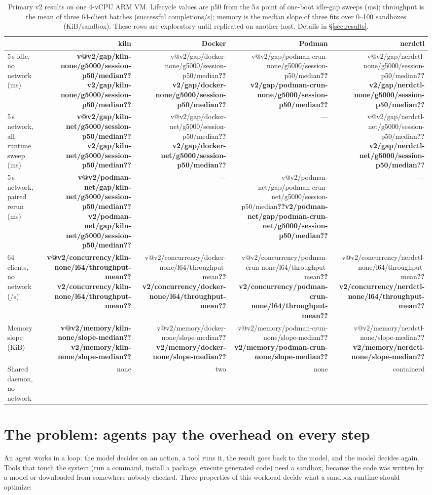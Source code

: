 \documentclass[10pt,letterpaper]{article}
\makeatletter
\newcommand{\Vone}[1]{\ifcsname v@#1\endcsname\pgfmathprintnumber[fixed,precision=1]{\csname v@#1\endcsname}\else\textbf{??#1??}\fi}
\makeatother
\begin{document}
\begin{table}[H]
\centering\footnotesize
\caption{Primary v2 results on one 4-vCPU ARM VM. Lifecycle values are p50 from
the 5\,s point of one-boot idle-gap sweeps (ms); throughput is the mean of
three 64-client batches (successful completions/s); memory is the median slope
of three fits over 0--100 sandboxes (KiB/sandbox). These rows are exploratory
until replicated on another host. Details in \S\ref{sec:results}.}
\label{tab:summary}
\begin{tabularx}{\linewidth}{@{}Xrrrr@{}}
\toprule
 & kiln & Docker & Podman & nerdctl \\
\midrule
5\,s idle, no network (ms) & \textbf{\Vone{v2/gap/kiln-none/g5000/session-p50/median}} & \Vone{v2/gap/docker-none/g5000/session-p50/median} & \Vone{v2/gap/podman-crun-none/g5000/session-p50/median} & \Vone{v2/gap/nerdctl-none/g5000/session-p50/median} \\
5\,s network, all-runtime sweep (ms) & \textbf{\Vone{v2/gap/kiln-net/g5000/session-p50/median}} & \Vone{v2/gap/docker-net/g5000/session-p50/median} & --- & \Vone{v2/gap/nerdctl-net/g5000/session-p50/median} \\
5\,s network, paired rerun (ms) & \textbf{\Vone{v2/podman-net/gap/kiln-net/g5000/session-p50/median}} & --- & \Vone{v2/podman-net/gap/podman-crun-net/g5000/session-p50/median} & --- \\
64 clients, no network (/s) & \textbf{\Vone{v2/concurrency/kiln-none/l64/throughput-mean}} & \Vone{v2/concurrency/docker-none/l64/throughput-mean} & \Vone{v2/concurrency/podman-crun-none/l64/throughput-mean} & \Vone{v2/concurrency/nerdctl-none/l64/throughput-mean} \\
Memory slope (KiB) & \textbf{\Vone{v2/memory/kiln-none/slope-median}} & \Vone{v2/memory/docker-none/slope-median} & \Vone{v2/memory/podman-crun-none/slope-median} & \Vone{v2/memory/nerdctl-none/slope-median} \\
Shared daemon, no network & none & two & none & containerd \\
\bottomrule
\end{tabularx}
\end{table}

\section{The problem: agents pay the overhead on every step}

An agent works in a loop: the model decides on an action, a tool runs it, the
result goes back to the model, and the model decides again. Tools that touch the
system (run a command, install a package, execute generated code) need a
sandbox, because the code was written by a model or downloaded from somewhere
nobody checked. Three properties of this workload decide what a sandbox runtime
should optimize:
\end{document}
